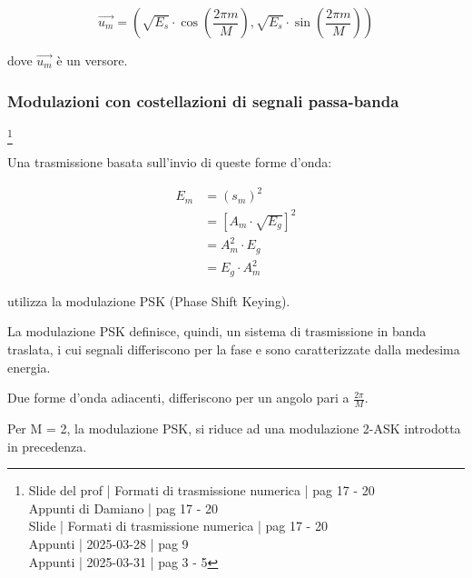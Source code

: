 {
    \Large 
    \begin{equation}
        \overrightarrow{u_m}
        = 
        \left(
            \sqrt{E_s} \cdot \cos(\frac{2 \pi m}{M})
            , 
            \sqrt{E_s} \cdot \sin(\frac{2 \pi m}{M})
        \right)
    \end{equation}
}

dove $\overrightarrow{u_m}$ è un versore. \newline 

\newpage 

\subsubsection{Modulazioni con costellazioni di segnali passa-banda}
\footnote{Slide del prof | Formati di trasmissione numerica | pag 17 - 20\\  
Appunti di Damiano | pag 17 - 20\\
Slide | Formati di trasmissione numerica | pag  17 - 20\\
Appunti | 2025-03-28 | pag 9 \\ 
Appunti | 2025-03-31 | pag 3 - 5
}

Una trasmissione basata sull'invio di queste forme d'onda: 

{
    \Large 
    \begin{equation}
        \begin{split}
            E_m 
            &= 
            (s_m)^{2}
            \\
            &= 
            \left[ A_m \cdot \sqrt{E_g} \right]^{2}
            \\
            &= 
            A_m ^{2} \cdot E_g 
            \\
            &= 
            E_g \cdot A_m ^{2}   
        \end{split}
    \end{equation}
} 

utilizza la modulazione PSK (Phase Shift Keying). \newline 

La modulazione PSK definisce, quindi, un sistema di trasmissione in banda traslata, 
i cui segnali differiscono per la fase e sono caratterizzate dalla medesima energia. \newline 

Due forme d'onda adiacenti, differiscono per un angolo pari a $\frac{2 \pi}{M}$. \newline 

Per M = 2, la modulazione PSK, si riduce ad una modulazione 2-ASK introdotta in precedenza. \newline 

